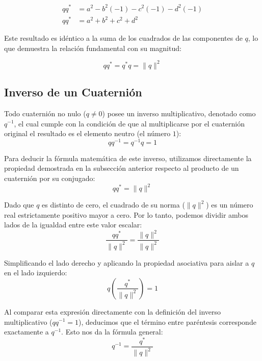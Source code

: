 \begin{align*}
    q q^* &= a^2 - b^2(-1) - c^2(-1) - d^2(-1) \\
    q q^* &= a^2 + b^2 + c^2 + d^2
\end{align*}

Este resultado es idéntico a la suma de los cuadrados de las componentes de $q$, lo que demuestra la relación fundamental con su magnitud:

\begin{equation}
    q q^* = q^* q = \lVert q \rVert^2
\end{equation}


\subsection{Inverso de un Cuaternión}
Todo cuaternión no nulo ($q \neq 0$) posee un inverso multiplicativo, denotado como $q^{-1}$, el cual cumple con la condición de que al multiplicarse por el cuaternión original el resultado es el elemento neutro (el número $1$):
\begin{equation}
    q q^{-1} = q^{-1} q = 1
\end{equation}

Para deducir la fórmula matemática de este inverso, utilizamos directamente la propiedad demostrada en la subsección anterior respecto al producto de un cuaternión por su conjugado:
\begin{equation}
    q q^* = \lVert q \rVert^2
\end{equation}

Dado que $q$ es distinto de cero, el cuadrado de su norma ($\lVert q \rVert^2$) es un número real estrictamente positivo mayor a cero. Por lo tanto, podemos dividir ambos lados de la igualdad entre este valor escalar:
\begin{equation}
    \frac{q q^*}{\lVert q \rVert^2} = \frac{\lVert q \rVert^2}{\lVert q \rVert^2}
\end{equation}

Simplificando el lado derecho y aplicando la propiedad asociativa para aislar a $q$ en el lado izquierdo:
\begin{equation}
    q \left( \frac{q^*}{\lVert q \rVert^2} \right) = 1
\end{equation}

Al comparar esta expresión directamente con la definición del inverso multiplicativo ($q q^{-1} = 1$), deducimos que el término entre paréntesis corresponde exactamente a $q^{-1}$. Esto nos da la fórmula general:
\begin{equation}
    q^{-1} = \frac{q^*}{\lVert q \rVert^2}
\end{equation}

